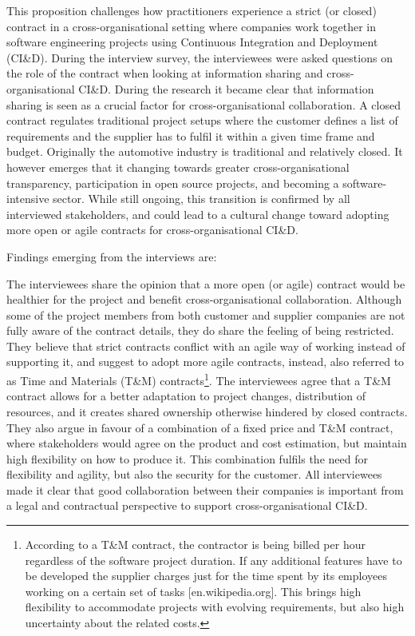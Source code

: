 This proposition challenges how practitioners experience a strict (or closed) contract in a cross-organisational setting where companies work together in software engineering projects using Continuous Integration and Deployment (CI\&D). During the interview survey, the interviewees were asked questions on the role of the contract when looking at information sharing and cross-organisational CI\&D. During the research it became clear that information sharing is seen as a crucial factor for cross-organisational collaboration. A closed contract regulates traditional project setups where the customer defines a list of requirements and the supplier has to fulfil it within a given time frame and budget. Originally the automotive industry is traditional and relatively closed. It however emerges that it changing towards greater cross-organisational transparency, participation in open source projects, and becoming a software-intensive sector. While still ongoing, this transition is confirmed by all interviewed stakeholders, and could lead to a cultural change toward adopting more open or agile contracts for cross-organisational CI\&D.



Findings emerging from the interviews are:

 The interviewees share the opinion that a more open (or agile) contract would be healthier for the project and benefit cross-organisational collaboration. Although some of the project members from both customer and supplier companies are not fully aware of the contract details, they do share the feeling of being restricted. They believe that strict contracts conflict with an agile way of working instead of supporting it, and suggest to adopt more agile contracts, instead, also referred to as Time and Materials (T\&M) contracts\footnote{According to a T\&M contract, the contractor is being billed per hour regardless of the software project duration. If any additional features have to be developed the supplier charges just for the time spent by its employees working on a certain set of tasks [en.wikipedia.org]. This brings high flexibility to accommodate projects with evolving requirements, but also high uncertainty about the related costs.}. 
The interviewees agree that a T\&M contract allows for a better adaptation to project changes, distribution of resources, and it creates shared ownership otherwise hindered by closed contracts. They also argue in favour of a combination of a fixed price and T\&M contract, where stakeholders would agree on the product and cost estimation, but maintain high flexibility on how to produce it. This combination fulfils the need for flexibility and agility, but also the security for the customer. All interviewees made it clear that good collaboration between their companies is important from a legal and contractual perspective to support cross-organisational CI\&D.

